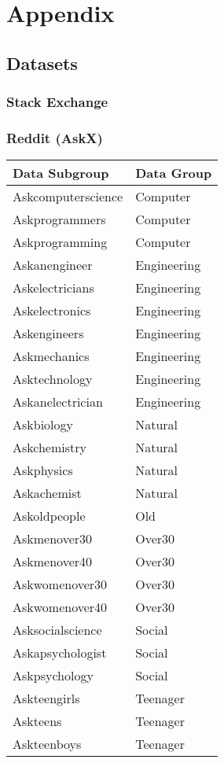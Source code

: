 %
\chapter{Appendix}
\label{sec:appendix}
\lstset{
  breakatwhitespace=true,
  breaklines=true,
  breakindent=0pt,
  numbers=none
}

\section{Datasets}
\label{sec:appendix:datasets}
\subsection{Stack Exchange}
\label{sec:appendix:datasets:stackex}

\subsection{Reddit (AskX)}
\label{sec:appendix:datasets:askx}
\begin{tabular}{ll}
  \toprule
  {Data Subgroup}    & {Data Group} \\
  \midrule
  Askcomputerscience & Computer     \\
  Askprogrammers     & Computer     \\
  Askprogramming     & Computer     \\
  Askanengineer      & Engineering  \\
  Askelectricians    & Engineering  \\
  Askelectronics     & Engineering  \\
  Askengineers       & Engineering  \\
  Askmechanics       & Engineering  \\
  Asktechnology      & Engineering  \\
  Askanelectrician   & Engineering  \\
  Askbiology         & Natural      \\
  Askchemistry       & Natural      \\
  Askphysics         & Natural      \\
  Askachemist        & Natural      \\
  Askoldpeople       & Old          \\
  Askmenover30       & Over30       \\
  Askmenover40       & Over30       \\
  Askwomenover30     & Over30       \\
  Askwomenover40     & Over30       \\
  Asksocialscience   & Social       \\
  Askapsychologist   & Social       \\
  Askpsychology      & Social       \\
  Askteengirls       & Teenager     \\
  Askteens           & Teenager     \\
  Askteenboys        & Teenager     \\
  \bottomrule
\end{tabular}


